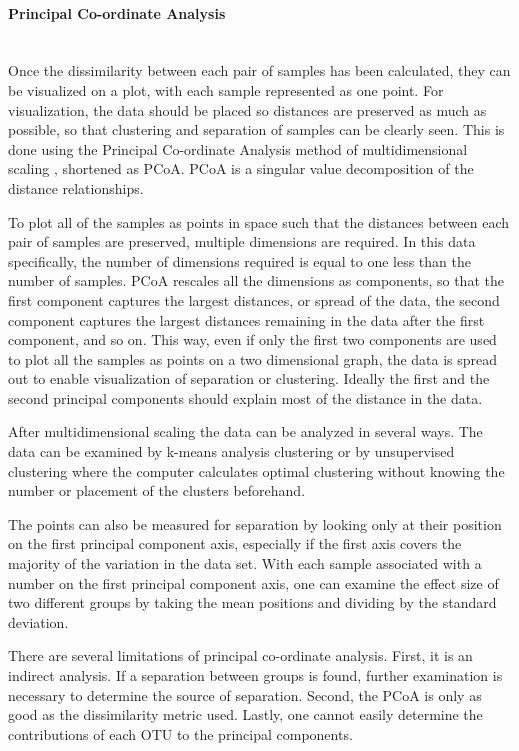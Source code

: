 \paragraph{Principal Co-ordinate Analysis}\mbox{}\\
Once the dissimilarity between each pair of samples has been calculated, they can be visualized on a plot, with each sample represented as one point. For visualization, the data should be placed so distances are preserved as much as possible, so that clustering and separation of samples can be clearly seen. This is done using the Principal Co-ordinate Analysis method of multidimensional scaling \cite{dollhopf2001interpreting}, shortened as PCoA. PCoA is a singular value decomposition of the distance relationships.

To plot all of the samples as points in space such that the distances between each pair of samples are preserved, multiple dimensions are required. In this data specifically, the number of dimensions required is equal to one less than the number of samples. PCoA rescales all the dimensions as components, so that the first component captures the largest distances, or spread of the data, the second component captures the largest distances remaining in the data after the first component, and so on. This way, even if only the first two components are used to plot all the samples as points on a two dimensional graph, the data is spread out to enable visualization of separation or clustering. Ideally the first and the second principal components should explain most of the distance in the data.

After multidimensional scaling the data can be analyzed in several ways. The data can be examined by k-means analysis clustering \cite{tibshirani2005cluster} or by unsupervised clustering where the computer calculates optimal clustering without knowing the number or placement of the clusters beforehand.

The points can also be measured for separation by looking only at their position on the first principal component axis, especially if the first axis covers the majority of the variation in the data set. With each sample associated with a number on the first principal component axis, one can examine the effect size of two different groups by taking the mean positions and dividing by the standard deviation.

There are several limitations of principal co-ordinate analysis. First, it is an indirect analysis. If a separation between groups is found, further examination is necessary to determine the source of separation. Second, the PCoA is only as good as the dissimilarity metric used. Lastly, one cannot easily determine the contributions of each OTU to the principal components.

